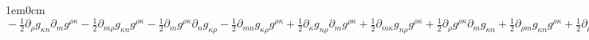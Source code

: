 \documentclass[12pt,a4paper,svgnames]{extarticle}
\begin{document}
\begin{adjustwidth}{1em}{0cm}${} - \frac{1}{2}\partial_{\rho}{g_{\kappa n}} \partial_{m}{g^{\rho \kappa}} - \frac{1}{2}\partial_{m \rho}{g_{\kappa n}} g^{\rho \kappa} - \frac{1}{2}\partial_{m}{g^{\rho \kappa}} \partial_{n}{g_{\kappa \rho}} - \frac{1}{2}\partial_{m n}{g_{\kappa \rho}} g^{\rho \kappa}+\frac{1}{2}\partial_{\kappa}{g_{n \rho}} \partial_{m}{g^{\rho \kappa}}+\frac{1}{2}\partial_{m \kappa}{g_{n \rho}} g^{\rho \kappa}+\frac{1}{2}\partial_{\rho}{g^{\rho \kappa}} \partial_{m}{g_{\kappa n}}+\frac{1}{2}\partial_{\rho m}{g_{\kappa n}} g^{\rho \kappa}+\frac{1}{2}\partial_{\rho}{g^{\rho \kappa}} \partial_{n}{g_{\kappa m}}+\frac{1}{2}\partial_{\rho n}{g_{\kappa m}} g^{\rho \kappa} - \frac{1}{2}\partial_{\rho}{g^{\rho \kappa}} \partial_{\kappa}{g_{n m}} - \frac{1}{2}\partial_{\rho \kappa}{g_{n m}} g^{\rho \kappa} - \frac{1}{4}\partial_{\eta}{g_{\mu m}} \partial_{\rho}{g_{\kappa n}} g^{\eta \kappa} g^{\rho \mu} - \frac{1}{4}\partial_{\rho}{g_{\kappa n}} \partial_{m}{g_{\mu \eta}} g^{\eta \kappa} g^{\rho \mu}+\frac{1}{4}\partial_{\rho}{g_{\kappa n}} \partial_{\mu}{g_{m \eta}} g^{\eta \kappa} g^{\rho \mu} - \frac{1}{4}\partial_{\eta}{g_{\mu m}} \partial_{n}{g_{\kappa \rho}} g^{\eta \kappa} g^{\rho \mu} - \frac{1}{4}\partial_{m}{g_{\mu \eta}} \partial_{n}{g_{\kappa \rho}} g^{\eta \kappa} g^{\rho \mu}+\frac{1}{4}\partial_{\mu}{g_{m \eta}} \partial_{n}{g_{\kappa \rho}} g^{\eta \kappa} g^{\rho \mu}+\frac{1}{4}\partial_{\eta}{g_{\mu m}} \partial_{\kappa}{g_{n \rho}} g^{\eta \kappa} g^{\rho \mu}%
+\frac{1}{4}\partial_{\kappa}{g_{n \rho}} \partial_{m}{g_{\mu \eta}} g^{\eta \kappa} g^{\rho \mu} - \frac{1}{4}\partial_{\kappa}{g_{n \rho}} \partial_{\mu}{g_{m \eta}} g^{\eta \kappa} g^{\rho \mu}+\frac{1}{4}\partial_{\eta}{g_{\mu \rho}} \partial_{m}{g_{\kappa n}} g^{\eta \kappa} g^{\rho \mu}+\frac{1}{4}\partial_{\rho}{g_{\mu \eta}} \partial_{m}{g_{\kappa n}} g^{\eta \kappa} g^{\rho \mu} - \frac{1}{4}\partial_{\mu}{g_{\rho \eta}} \partial_{m}{g_{\kappa n}} g^{\eta \kappa} g^{\rho \mu}+\frac{1}{4}\partial_{\eta}{g_{\mu \rho}} \partial_{n}{g_{\kappa m}} g^{\eta \kappa} g^{\rho \mu}+\frac{1}{4}\partial_{\rho}{g_{\mu \eta}} \partial_{n}{g_{\kappa m}} g^{\eta \kappa} g^{\rho \mu} - \frac{1}{4}\partial_{\mu}{g_{\rho \eta}} \partial_{n}{g_{\kappa m}} g^{\eta \kappa} g^{\rho \mu} - \frac{1}{4}\partial_{\eta}{g_{\mu \rho}} \partial_{\kappa}{g_{n m}} g^{\eta \kappa} g^{\rho \mu} - \frac{1}{4}\partial_{\rho}{g_{\mu \eta}} \partial_{\kappa}{g_{n m}} g^{\eta \kappa} g^{\rho \mu}+\frac{1}{4}\partial_{\mu}{g_{\rho \eta}} \partial_{\kappa}{g_{n m}} g^{\eta \kappa} g^{\rho \mu}$\end{adjustwidth}
\end{document}
